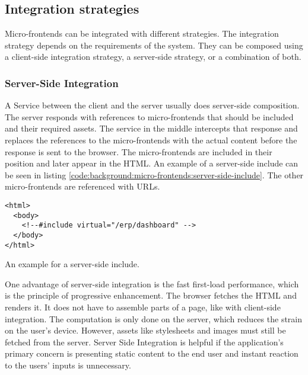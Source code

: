 \subsection{Integration strategies}\label{subsection:background:micro-frontend-architecture:integration-strategies}

Micro-frontends can be integrated with different strategies. The integration strategy depends on the requirements of the system. They can be composed using a client-side integration strategy, a server-side strategy, or a combination of both.

\subsubsection{Server-Side Integration}\label{subsubsection:background:micro-frontend-architecture:integration-strategies:server-side-integration}

A Service between the client and the server usually does server-side composition. \cite[60]{book:2020:geers:background:micro-frontends:micro-frontends-in-action} The server responds with references to micro-frontends that should be included and their required assets. The service in the middle intercepts that response and replaces the references to the micro-frontends with the actual content before the response is sent to the browser. The micro-frontends are included in their position and later appear in the \ac{HTML}. An example of a server-side include can be seen in listing \ref{code:background:micro-frontends:server-side-include}. The other micro-frontends are referenced with \acp{URL}. \cite[61-63]{book:2020:geers:background:micro-frontends:micro-frontends-in-action}

\ifshowListings
\begin{listing}[H]
    \begin{verbatim}
<html>
  <body>
    <!--#include virtual="/erp/dashboard" -->
  </body>
</html>
    \end{verbatim}
    \caption{An example for a server-side include.}\label{code:background:micro-frontends:server-side-include}
\end{listing}
\fi

\bigskip

\noindent One advantage of server-side integration is the fast first-load performance, which is the principle of progressive enhancement. \cite{book:2010:parker:background:micro-frontends:designing-with-progressive-enhancement} The browser fetches the \ac{HTML} and renders it. It does not have to assemble parts of a page, like with client-side integration. The computation is only done on the server, which reduces the strain on the user's device. \cite{book:2020:geers:background:micro-frontends:micro-frontends-in-action} However, assets like stylesheets and images must still be fetched from the server. Server Side Integration is helpful if the application's primary concern is presenting static content to the end user and instant reaction to the users' inputs is unnecessary.  \cite[83]{book:2020:geers:background:micro-frontends:micro-frontends-in-action}

